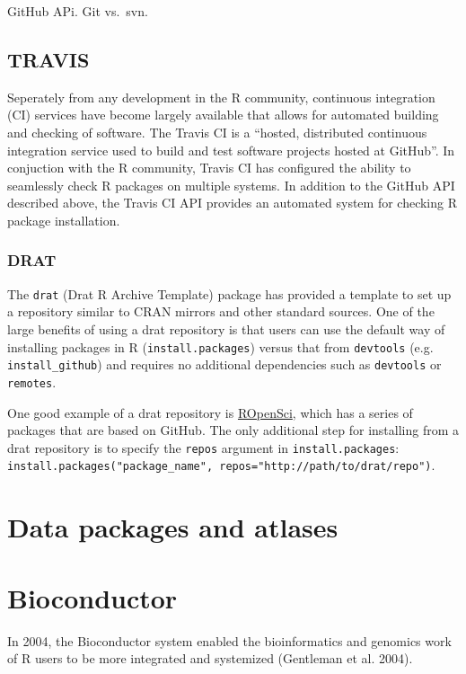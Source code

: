 \documentclass[]{elsarticle} %
\begin{document}
GitHub APi. Git vs.~svn.

\subsection{TRAVIS}\label{travis}

Seperately from any development in the R community, continuous
integration (CI) services have become largely available that allows for
automated building and checking of software. The Travis CI is a
``hosted, distributed continuous integration service used to build and
test software projects hosted at GitHub''. In conjuction with the R
community, Travis CI has configured the ability to seamlessly check R
packages on multiple systems. In addition to the GitHub API described
above, the Travis CI API provides an automated system for checking R
package installation.

\subsubsection{DRAT}\label{drat}

The \texttt{drat} (Drat R Archive Template) package has provided a
template to set up a repository similar to CRAN mirrors and other
standard sources. One of the large benefits of using a drat repository
is that users can use the default way of installing packages in R
(\texttt{install.packages}) versus that from \texttt{devtools} (e.g.
\texttt{install\_github}) and requires no additional dependencies such
as \texttt{devtools} or \texttt{remotes}.

One good example of a drat repository is
\href{https://ropensci.org/}{ROpenSci}, which has a series of packages
that are based on GitHub. The only additional step for installing from a
drat repository is to specify the \texttt{repos} argument in
\texttt{install.packages}:
\texttt{install.packages("package\_name",\ repos="http://path/to/drat/repo")}.

\section{Data packages and atlases}\label{datapackages}

\section{Bioconductor}\label{bioconductor}

In 2004, the Bioconductor system enabled the bioinformatics and genomics
work of R users to be more integrated and systemized (Gentleman et al.
2004).
\end{document}
